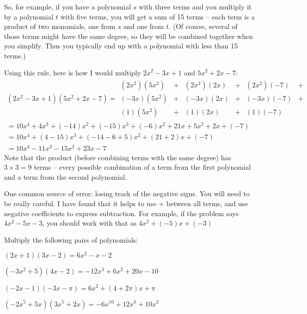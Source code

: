 So, for example, if you have a polynomial $s$ with three terms and you
multiply it by a polynomial $t$ with five terms, you will get a sum of
15 terms -- each term is a product of two monomials, one from $s$ and
one from $t$.  (Of course, several of those terms might have the same
degree, so they will be combined together when you simplify. Thus you
typically end up with a polynomial with less than 15 terms.)

Using this rule, here is how I would multiply $2x^2 - 3x + 1$ and
$5x^2 + 2x - 7$:
\begin{multline*}
  (2x^2 - 3x + 1)(5x^2 + 2x - 7)  = \begin{matrix}
  (2x^2)(5x^2)& + &(2x^2)(2x)& + &(2x^2)(-7)& + \\
  (-3x)(5x^2)& + &(-3x)(2x)& + &(-3x)(-7)& + \\
    (1)(5x^2)& + &(1)(2x)& + &(1)(-7)& 
  \end{matrix} \\
  = 10x^4 + 4x^3 + (-14)x^2 + (-15)x^3 + (-6)x^2 + 21x +5x^2 + 2x + (-7) \\
  = 10x^4 + (4 - 15)x^3 + (-14 - 6 + 5)x^2  + (21 + 2)x + (-7) \\
  = 10x^4 - 11x^3 - 15x^2 + 23x - 7
\end{multline*}
Note that the product (before combining terms with the same degree) has
$3 \times 3 = 9$ terms -- every possible combination of a term from the
first polynomial and a term from the second polynomial.

One common source of error: losing track of the negative
signs. You will need to be really careful. I have found that it
helps to use + between all terms, and use negative coefficients to
express subtraction. For example, if the problem says $4x^2 - 5x - 3$,
you should work with that as $4x^2 + (-5)x + (-3)$

\begin{Exercise}[title={Multiplying polynomials}, label=multpolys]
  Multiply the following pairs of polynomials:
  \vspace{15mm}
  \vspace{15mm}
  \vspace{15mm}
  \vspace{15mm}

\end{Exercise}
\begin{Answer}[ref=multpolys]
  $(2x + 1)(3x - 2) = 6x^2 - x - 2$

  $(-3x^2 + 5)(4x - 2) = -12x^3 + 6x^2 + 20x - 10$

  $(-2x - 1)(-3x - \pi) = 6x^2 + (4 + 2\pi)x + \pi$ 

  $(-2x^5 + 5x)(3x^5 + 2x) = -6x^{10} + 12x^6 + 10x^2$
\end{Answer}

